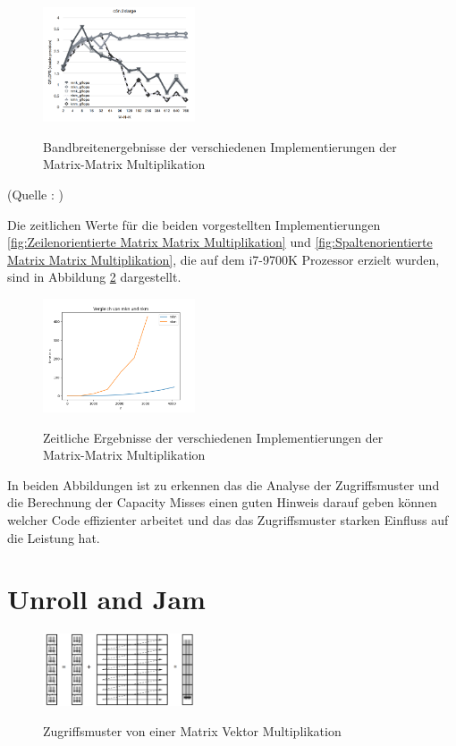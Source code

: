 \documentclass[sigconf,language=ngerman]{acmart}
\begin{document}
\begin{figure}[ht]
    \centering
    \caption{Bandbreitenergebnisse der verschiedenen Implementierungen der Matrix-Matrix Multiplikation}
    \includegraphics[width=0.4\textwidth]{Abbildung 13.png}
    \label{Performance der verschiedenen Implementierungen der Matrix-Matrix Multiplikation}
    \end{figure}
(Quelle : \cite{Breuer_Benchmark_PC1})

Die zeitlichen Werte für die beiden vorgestellten Implementierungen \ref{fig:Zeilenorientierte Matrix Matrix Multiplikation} und \ref{fig:Spaltenorientierte Matrix Matrix Multiplikation}, 
die auf dem i7-9700K Prozessor erzielt wurden, sind in Abbildung \ref{Performance der beiden Implementierungen der Matrix-Matrix Multiplikation} dargestellt.

\begin{figure}[ht]
    \centering
    \caption{Zeitliche Ergebnisse der verschiedenen Implementierungen der Matrix-Matrix Multiplikation}
    \includegraphics[width=0.4\textwidth]{Abbildung 14.png}
    \label{Performance der beiden Implementierungen der Matrix-Matrix Multiplikation}
    \end{figure}
In beiden Abbildungen ist zu erkennen das die Analyse der Zugriffsmuster und die Berechnung der Capacity Misses
einen guten Hinweis darauf geben können welcher Code effizienter arbeitet und das das Zugriffsmuster starken
Einfluss auf die Leistung hat.



\section{Unroll and Jam}
\begin{figure}[ht]
    \centering
    \caption{Zugriffsmuster von einer Matrix Vektor Multiplikation \cite{hager-2010}}
    \includegraphics[width=0.4\textwidth]{Abbildung 16.png}
    \label{MVM Zugriffsmuster}
    \end{figure}
\end{document}
